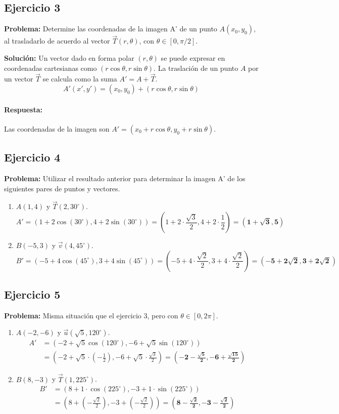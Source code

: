 \documentclass[12pt, letterpaper]{article}
\begin{document}
\subsection{Ejercicio 3}
\textbf{Problema:} Determine las coordenadas de la imagen A' de un punto $A(x_0, y_0)$, al trasladarlo de acuerdo al vector $\vec{T}(r, \theta)$, con $\theta \in [0, \pi/2]$.

\textbf{Solución:} Un vector dado en forma polar $(r, \theta)$ se puede expresar en coordenadas cartesianas como $(r\cos\theta, r\sin\theta)$. La traslación de un punto $A$ por un vector $\vec{T}$ se calcula como la suma $A' = A + \vec{T}$.
\[ A'(x', y') = (x_0, y_0) + (r\cos\theta, r\sin\theta) \]
\paragraph{Respuesta:} Las coordenadas de la imagen son $A' = (x_0 + r\cos\theta, y_0 + r\sin\theta)$.

\subsection{Ejercicio 4}
\textbf{Problema:} Utilizar el resultado anterior para determinar la imagen A' de los siguientes pares de puntos y vectores.
\begin{enumerate}[label=\alph*)]
    \item $A(1,4)$ y $\vec{T}(2, 30^\circ)$.
    \[ A' = (1 + 2\cos(30^\circ), 4 + 2\sin(30^\circ)) = \left(1 + 2\cdot\frac{\sqrt{3}}{2}, 4 + 2\cdot\frac{1}{2}\right) = \mathbf{(1+\sqrt{3}, 5)} \]
    \item $B(-5,3)$ y $\vec{v}(4, 45^\circ)$.
    \[ B' = (-5 + 4\cos(45^\circ), 3 + 4\sin(45^\circ)) = \left(-5 + 4\cdot\frac{\sqrt{2}}{2}, 3 + 4\cdot\frac{\sqrt{2}}{2}\right) = \mathbf{(-5+2\sqrt{2}, 3+2\sqrt{2})} \]
\end{enumerate}

\subsection{Ejercicio 5}
\textbf{Problema:} Misma situación que el ejercicio 3, pero con $\theta \in [0, 2\pi]$.
\begin{enumerate}[label=\alph*)]
    \item $A(-2,-6)$ y $\vec{u}(\sqrt{5}, 120^\circ)$.
    \begin{align*}
        A' &= (-2 + \sqrt{5}\cos(120^\circ), -6 + \sqrt{5}\sin(120^\circ)) \\
           &= \left(-2 + \sqrt{5}\cdot(-\frac{1}{2}), -6 + \sqrt{5}\cdot\frac{\sqrt{3}}{2}\right) = \mathbf{\left( -2-\frac{\sqrt{5}}{2}, -6+\frac{\sqrt{15}}{2} \right)} 
    \end{align*}
    \item $B(8,-3)$ y $\vec{T}(1, 225^\circ)$.
    \begin{align*}
        B' &= (8 + 1\cdot\cos(225^\circ), -3 + 1\cdot\sin(225^\circ)) \\
           &= \left(8 + (-\frac{\sqrt{2}}{2}), -3 + (-\frac{\sqrt{2}}{2})\right) = \mathbf{\left(8 - \frac{\sqrt{2}}{2}, -3 - \frac{\sqrt{2}}{2}\right)}
    \end{align*}
\end{enumerate}
\end{document}
